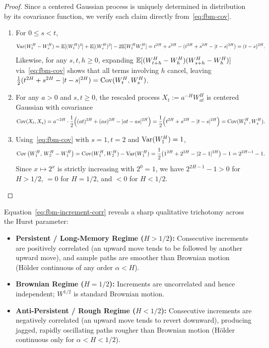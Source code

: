 \begin{proof}
Since a centered Gaussian process is uniquely determined in distribution by its covariance function, we verify each claim directly from~\eqref{eq:fbm-cov}.
\begin{enumerate}
    \item For $0 \le s < t$,
    \[
    \operatorname{Var}(W_t^H - W_s^H) = \mathbb{E}[(W_t^H)^2] + \mathbb{E}[(W_s^H)^2] - 2\mathbb{E}[W_t^H W_s^H] = t^{2H} + s^{2H} - (t^{2H} + s^{2H} - |t - s|^{2H}) = (t - s)^{2H}.
    \]
    Likewise, for any $s, t, h \ge 0$, expanding $\mathbb{E}[(W_{t+h}^H - W_h^H)(W_{s+h}^H - W_h^H)]$ via~\eqref{eq:fbm-cov} shows that all terms involving $h$ cancel, leaving $\frac{1}{2}(t^{2H} + s^{2H} - |t - s|^{2H}) = \operatorname{Cov}(W_t^H, W_s^H)$.

    \item For any $a > 0$ and $s, t \ge 0$, the rescaled process $X_t := a^{-H} W_{at}^H$ is centered Gaussian with covariance
    \[
    \operatorname{Cov}(X_t, X_s) = a^{-2H}\cdot \frac{1}{2}\Big((at)^{2H} + (as)^{2H} - |at - as|^{2H}\Big) = \frac{1}{2}\Big(t^{2H} + s^{2H} - |t - s|^{2H}\Big) = \operatorname{Cov}(W_t^H, W_s^H).
    \]

    \item Using~\eqref{eq:fbm-cov} with $s = 1, t = 2$ and $\operatorname{Var}(W_1^H) = 1$,
    \[
    \operatorname{Cov}\big(W_1^H,\, W_2^H - W_1^H\big) = \operatorname{Cov}(W_1^H, W_2^H) - \operatorname{Var}(W_1^H) = \frac{1}{2}\big(1^{2H} + 2^{2H} - |2 - 1|^{2H}\big) - 1 = 2^{2H - 1} - 1.
    \]
    Since $x \mapsto 2^x$ is strictly increasing with $2^0 = 1$, we have $2^{2H - 1} - 1 > 0$ for $H > 1/2$, $= 0$ for $H = 1/2$, and $< 0$ for $H < 1/2$. \qedhere
\end{enumerate}
\end{proof}

Equation~\eqref{eq:fbm-increment-corr} reveals a sharp qualitative trichotomy across the Hurst parameter:
\begin{itemize}
    \item \textbf{Persistent / Long-Memory Regime ($H > 1/2$):} Consecutive increments are positively correlated (an upward move tends to be followed by another upward move), and sample paths are smoother than Brownian motion (H\"older continuous of any order $\alpha < H$).
    \item \textbf{Brownian Regime ($H = 1/2$):} Increments are uncorrelated and hence independent; $W^{1/2}$ is standard Brownian motion.
    \item \textbf{Anti-Persistent / Rough Regime ($H < 1/2$):} Consecutive increments are negatively correlated (an upward move tends to revert downward), producing jagged, rapidly oscillating paths rougher than Brownian motion (H\"older continuous only for $\alpha < H < 1/2$).
\end{itemize}

